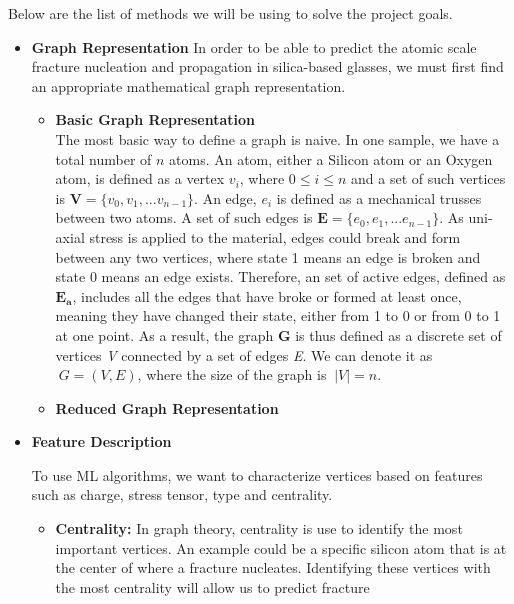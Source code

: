 Below are the list of methods we will be using to solve the project goals.

\begin{itemize}

\item \textbf{Graph Representation}
\bigskip
In order to be able to predict the atomic scale fracture nucleation and propagation in silica-based glasses, we must first find an appropriate mathematical graph representation. 
\begin{itemize}
    \item \textbf{Basic Graph Representation}
    \\
    The most basic way to define a graph is naive. In one sample, we have a total number of $n$ atoms. An atom, either a Silicon atom or an Oxygen atom, is defined as a vertex $v_i$, where $0 \leq i \leq n$ and a set of such vertices is $\mathbf{V} = \{v_0,v_1,...v_{n-1}\}$. An edge, $e_i$ is defined as a mechanical trusses between two atoms. A set of such edges is $\mathbf{E} = \{e_0,e_1,...e_{n-1}\}$. As uni-axial stress is applied to the material, edges could break and form between any two vertices, where state 1 means an edge is broken and state 0 means an edge exists. Therefore, an set of active edges, defined as $\mathbf{E_a}$, includes all the edges that have broke or formed at least once, meaning they have changed their state, either from 1 to 0 or from 0 to 1 at one point. As a result, the graph \textbf{G} is thus defined as a discrete set of vertices \textit{V} connected by a set of edges \textit{E}. We can denote it as $\ G = (V,E)$, where the size of the graph is $\ |V| = n $.
    
    \item \textbf{Reduced Graph Representation}
    \\
    
    
\end{itemize}


\item \textbf{Feature Description}
\bigskip

To use ML algorithms, we want to characterize vertices based on features such as charge, stress tensor, type and centrality.

\begin{itemize}
    \item \textbf{Centrality:} In graph theory, centrality is use to identify the most important vertices. An example could be a specific silicon atom that is at the center of where a fracture nucleates. Identifying these vertices with the most centrality will allow us to predict fracture
\end{itemize}








\end{itemize}

